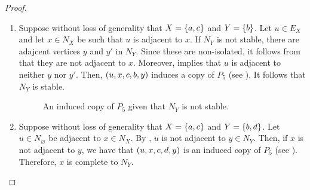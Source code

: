 \begin{proof}
\begin{enumerate}[label=(\roman*)]
            \noindent
            We conclude that $x$ is unique, so $N_X\setminus \l{x}$ is
            anticomplete to all nontrivial components of $G[E_X]$.

        \item Suppose without loss of generality that $X=\left\{a,c\right\}$ and $Y=\left\{b\right\}$.
            Let $u\in E_{X}$ and let $x\in N_X$ be such that $u$ is adjacent to
            $x$. If $N_Y$ is not stable, there are adajcent vertices $y$ and
            $y'$ in $N_Y$. Since these are non-isolated, it follows from
             that they are not adjacent to $x$. Moreover,
             implies that $u$ is adjacent to neither $y$ nor
            $y'$. Then, $\left(u,x,c,b,y\right)$ induces a copy of $P_5$ (see
            ).  It follows that $N_Y$ is stable. 

            \begin{figure}[htb!]
                \centering
                \caption{An induced copy of $P_5$ given that $N_Y$ is not stable.}
                \label{fig:3_bags_empty_5}
            \end{figure}
        
        \item Suppose without loss of generality that $X=\left\{a,c\right\}$ and
            $Y=\left\{b,d\right\}$. Let $u\in N_\varnothing$ be adjacent to $x \in N_X$. By
            , $u$ is not adjacent to $y\in N_Y$. Then, if $x$
            is not adjacent to $y$, we have that $\left(u,x,c,d,y\right)$ is an induced
            copy of $P_5$ (see ). Therefore, $x$ is
            complete to $N_Y$.


\end{enumerate}
\end{proof}
